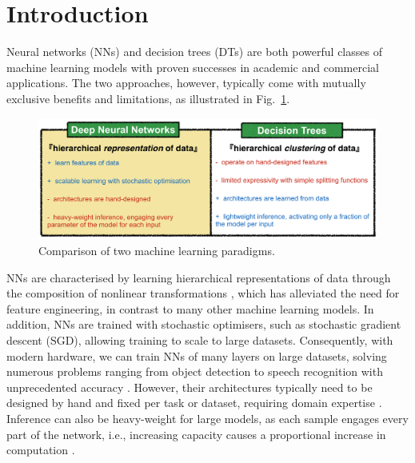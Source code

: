 \section{Introduction}
Neural networks (NNs) and decision trees (DTs) are both powerful classes of machine learning models with proven successes in academic and commercial applications. The two approaches, however, typically come with mutually exclusive benefits and limitations, as illustrated in Fig.~\ref{fig:pros_and_cons}.

\begin{figure}[ht]
	\center
	\includegraphics[width=0.85\linewidth]{chapter_7/figures/pros_and_cons.png}
	\caption{\small Comparison of two machine learning paradigms. }
	\label{fig:pros_and_cons}
\end{figure}

NNs are characterised by learning hierarchical representations of data through the composition of nonlinear transformations \cite{zeiler2014visualizing,bengio2013deep}, %
which has alleviated the need for feature engineering, in contrast to many other machine learning models. In addition, NNs are trained with stochastic optimisers, such as stochastic gradient descent (SGD), allowing training to scale to large datasets. Consequently, with modern hardware, we can train NNs of many layers on large datasets, solving numerous problems ranging from object detection to speech recognition with unprecedented accuracy \cite{lecun2015deep}. However, their architectures typically need to be designed by hand and fixed per task or dataset, requiring domain expertise \cite{zoph2016neural}. Inference can also be heavy-weight for large models, as each sample engages every part of the network, i.e., increasing capacity causes a proportional increase in computation \cite{bengio2013estimating}. 

